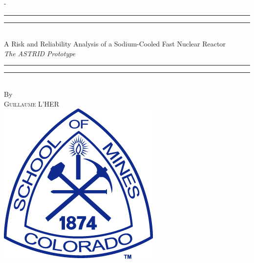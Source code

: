 %
%
% 
%
%
\begin{titlingpage}
\begin{SingleSpace}
\calccentering{\unitlength} 
\begin{adjustwidth*}{\unitlength}{-\unitlength}
\vspace*{13mm}
\begin{center}
\rule[0.5ex]{\linewidth}{2pt}\vspace*{-\baselineskip}\vspace*{3.2pt}
\rule[0.5ex]{\linewidth}{1pt}\\[\baselineskip]
{\HUGE A Risk and Reliability Analysis of a Sodium-Cooled Fast Nuclear Reactor }\\[4mm]
{\Large \textit{The ASTRID Prototype}}\\
\rule[0.5ex]{\linewidth}{1pt}\vspace*{-\baselineskip}\vspace{3.2pt}
\rule[0.5ex]{\linewidth}{2pt}\\
\vspace{6.5mm}
{\large By}\\
\vspace{6.5mm}
{\large\textsc{Guillaume L'HER}}\\
\vspace{11mm}
\includegraphics[scale=0.6]{logos/CSM}\\

\end{center}
\end{adjustwidth*}
\end{SingleSpace}
\end{titlingpage}
